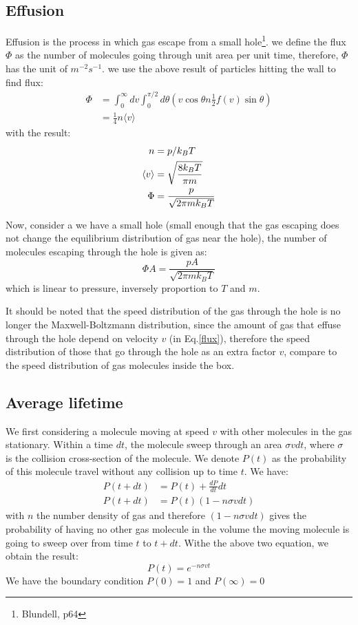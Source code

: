 \documentclass{article}
\begin{document}
\subsection*{Effusion}
Effusion is the process in which gas escape from a small hole\footnote{Blundell, p64}. we define 
the flux $\Phi$ as the number of molecules going through unit area per unit time,
therefore, $\Phi$ has the unit of $m^{-2}s^{-1}$. we use the above result of particles 
hitting the wall to find flux:
\begin{align}
    \Phi &= \int_0^{\infty} dv \int_0^{\pi/2} d\theta 
            \left( v \cos \theta n \frac{1}{2} f(v) \sin\theta \right) \label{flux} \\
        &= \frac{1}{4} n \langle v \rangle
\end{align}
with the result:
\begin{align}
    n &= p / k_B T \notag \\
    \langle v \rangle &= \sqrt{\frac{8k_BT}{\pi m}} \notag \\
    \Phi &= \frac{p}{\sqrt{2\pi m k_BT}}
\end{align}

Now, consider a we have a small hole (small enough that the gas escaping does not 
change the equilibrium distribution of gas near the hole), the number of molecules
escaping through the hole is given as:
\begin{equation}
    \Phi A = \frac{pA}{\sqrt{2\pi m k_BT}}
\end{equation}
which is linear to pressure, inversely proportion to $T$ and $m$. 

It should be noted that the speed distribution of the gas through the hole is no longer the 
Maxwell-Boltzmann distribution, since the amount of gas that effuse through the 
hole depend on velocity $v$ (in Eq.\ref{flux}), therefore the speed distribution
of those that go through the hole as an extra factor $v$, compare to the speed 
distribution of gas molecules inside the box.

\subsection*{Average lifetime}
We first considering a molecule moving at speed $v$ with other molecules in
the gas stationary. Within a time $dt$, the molecule sweep through an area $\sigma v dt$,
where $\sigma$ is the collision cross-section of the molecule. We denote $P(t)$ as 
the probability of this molecule travel without any collision up to time $t$. We have:
\begin{align}
    P(t + dt) &= P(t) + \frac{dP}{dt}dt \\
    P(t + dt) &= P(t) (1 - n\sigma v dt) 
\end{align}
with $n$ the number density of gas and therefore $(1 - n\sigma v dt)$ gives the 
probability of having no other gas molecule in the volume the moving molecule is going 
to sweep over from time $t$ to $t + dt$. 
Withe the above two equation, we obtain the result:
\begin{equation}
    P(t) = e^{-n\sigma vt}
\end{equation}
We have the boundary condition $P(0) = 1$ and $P(\infty) = 0$
\end{document}
